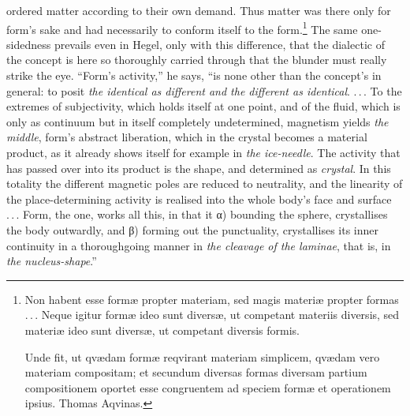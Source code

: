 \documentclass[12pt,a4paper]{book}
\begin{document}
ordered matter according to their own demand. Thus matter was there only for form's sake and had necessarily to conform
itself to the
form.\footnote{%
Non habent esse formæ propter materiam, sed magis materiæ propter formas .\,.\,. Neque igitur formæ ideo sunt diversæ, ut
competant materiis diversis, sed materiæ ideo sunt diversæ, ut competant diversis formis.\par
Unde fit, ut qvædam formæ reqvirant materiam simplicem, qvædam vero materiam compositam; et secundum diversas formas
diversam partium compositionem oportet esse congruentem ad speciem formæ et operationem ipsius. Thomas Aqvinas.}
The same one-sidedness prevails even in Hegel, only with this difference, that the dialectic of the concept is here so
thoroughly carried through that the blunder must really strike the eye. ``Form's activity,'' he says, ``is none other
than the concept's in general: to posit \emph{the identical as different and the different as identical}. .\,.\,. To the
extremes of subjectivity, which holds itself at one point, and of the fluid, which is only as continuum but in itself
completely undetermined, magnetism yields \emph{the middle}, form's abstract liberation, which in the crystal becomes a
material product, as it already shows itself for example in \emph{the ice-needle}. The activity that has passed over into
its product is the shape, and determined as \emph{crystal}. In this totality the different magnetic poles are reduced to
neutrality, and the linearity of the place-determining activity is realised into the whole body's face and surface
.\,.\,.
Form, the one, works all this, in that it α) bounding the sphere, crystallises the body outwardly, and β) forming out the
punctuality, crystallises its inner continuity in a thoroughgoing manner in \emph{the cleavage of the laminae}, that is,
in \emph{the nucleus-shape}.''
\end{document}
